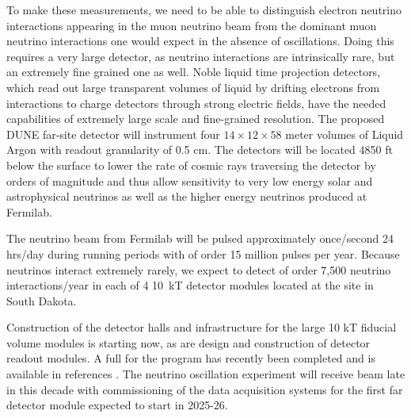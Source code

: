 To make these measurements, we need to be able to distinguish electron neutrino interactions appearing in the muon neutrino beam from the dominant muon neutrino interactions one would expect in the absence of oscillations.  Doing this requires a very large detector, as neutrino interactions are intrinsically rare, but an extremely  fine grained one as well.  Noble liquid time projection detectors, which read out large transparent volumes of liquid by drifting electrons from interactions to charge detectors through strong electric fields, have the needed capabilities of extremely large scale and fine-grained resolution. The proposed DUNE far-site detector will instrument four  $14\times12 \times58$ meter volumes of Liquid Argon with readout granularity of 0.5 cm.  The detectors will be located 4850 ft below the surface to lower the rate of cosmic rays traversing the detector by orders of magnitude and thus allow sensitivity to very low energy solar and astrophysical neutrinos as well as the higher energy neutrinos produced at Fermilab. 




The neutrino beam from Fermilab will be pulsed approximately once/second 24 hrs/day during running periods with of order 15 million pulses per year.  Because neutrinos interact  extremely rarely, we expect to detect of order 7,500  neutrino interactions/year in each of 4 10~kT detector modules located at the  site in South Dakota. 






Construction of the detector halls and infrastructure for the large 10 kT fiducial volume  modules is starting now, as are design and construction of detector readout modules.  A full  for the program has recently been completed and is available in references \cite{Abi:2020wmh, Abi:2020evt, Abi:2020oxb, Abi:2020loh}.
The   neutrino oscillation experiment will receive beam late in this decade with commissioning of the data acquisition systems for the first far detector module expected to start in 2025-26.  

